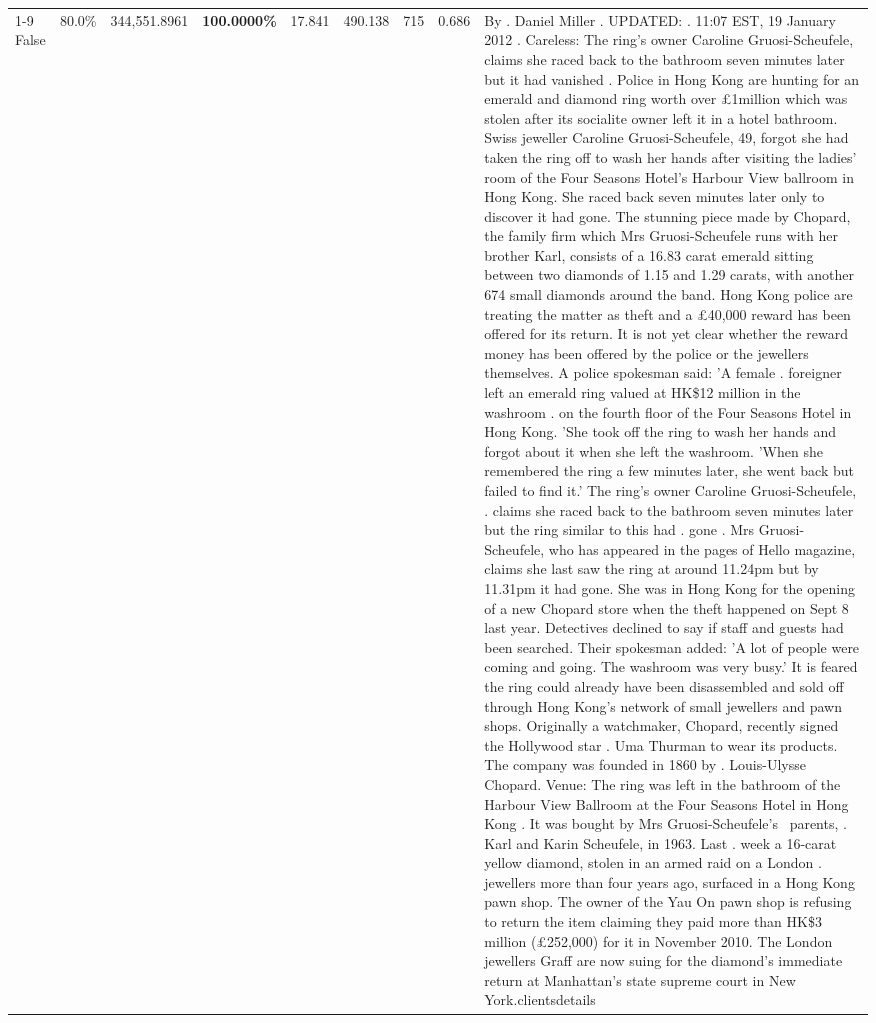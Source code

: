 \begin{table}[H]
\begin{tabular}{lllrlllll}
\cline{1-9}
False & 80.0\% & 344,551.8961 & \bfseries \color{red} 100.0000\% & 17.841 & 490.138 & 715 & 0.686 & By . Daniel Miller . UPDATED: . 11:07 EST, 19 January 2012 . Careless: The ring's owner Caroline Gruosi-Scheufele, claims she raced back to the bathroom seven minutes later but it had vanished . Police in Hong Kong are hunting for an emerald and diamond ring worth over £1million which was stolen after its socialite owner left it in a hotel bathroom. Swiss jeweller Caroline Gruosi-Scheufele, 49, forgot she had taken the ring off to wash her hands after visiting the ladies' room of the Four Seasons Hotel's Harbour View ballroom in Hong Kong. She raced back seven minutes later only to discover it had gone. The stunning piece made by Chopard, the family firm which Mrs Gruosi-Scheufele runs with her brother Karl, consists of a 16.83 carat emerald sitting between two diamonds of 1.15 and 1.29 carats, with another 674 small diamonds around the band. Hong Kong police are treating the matter as theft and a £40,000 reward has been offered for its return. It is not yet clear whether the reward money has been offered by the police or the jewellers themselves. A police spokesman said: 'A female . foreigner left an emerald ring valued at HK\$12 million in the washroom . on the fourth floor of the Four Seasons Hotel in Hong Kong. 'She took off the ring to wash her hands and forgot about it when she left the washroom. 'When she remembered the ring a few minutes later, she went back but failed to find it.' The ring's owner Caroline Gruosi-Scheufele, . claims she raced back to the bathroom seven minutes later but the ring similar to this had . gone . Mrs Gruosi-Scheufele, who has appeared in the pages of Hello magazine, claims she last saw the ring at around 11.24pm but by 11.31pm it had gone. She was in Hong Kong for the opening of a new Chopard store when the theft happened on Sept 8 last year. Detectives declined to say if staff and guests had been searched. Their spokesman added: 'A lot of people were coming and going. The washroom was very busy.' It is feared the ring could already have been disassembled and sold off through Hong Kong's network of small jewellers and pawn shops. Originally a watchmaker, Chopard, recently signed the Hollywood star . Uma Thurman to wear its products. The company was founded in 1860 by . Louis-Ulysse Chopard. Venue: The ring was left in the bathroom of the Harbour View Ballroom at the Four Seasons Hotel in Hong Kong . It was bought by Mrs Gruosi-Scheufele's  parents, . Karl and Karin Scheufele, in 1963. Last . week a 16-carat yellow diamond, stolen in an armed raid on a London . jewellers more than four years ago, surfaced in a Hong Kong pawn shop. The owner of the Yau On pawn shop is refusing to return the item claiming they paid more than HK\$3 million (£252,000) for it in November 2010. The London jewellers Graff are now suing for the diamond’s immediate return at Manhattan’s state supreme court in New York.clientsdetails \\

\end{tabular}
\end{table}
